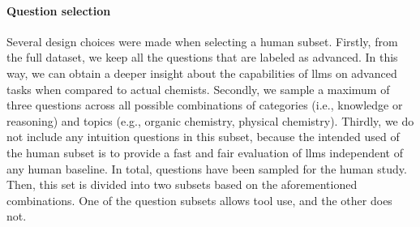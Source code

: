 \paragraph{Question selection}

Several design choices were made when selecting a human subset. Firstly, from the full dataset, we keep all the questions that are labeled as advanced. In this way, we can obtain a deeper insight about the capabilities of \glspl{llm} on advanced tasks
when compared to actual chemists. Secondly, we sample a maximum of three questions across all possible combinations of categories (i.e., knowledge or reasoning) and topics (e.g., organic chemistry, physical chemistry). Thirdly, we do not include any intuition questions in this subset, because the intended used of the human subset is to provide a fast and fair evaluation of \glspl{llm} independent of any human baseline. In total,  questions have been sampled for the human study. Then, this set is divided into two subsets based on the aforementioned combinations. One of the question subsets allows tool use, and the other does not.
